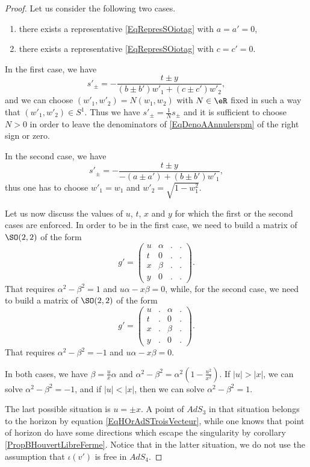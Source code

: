 \begin{proof}
Let us consider the following two cases.
\begin{enumerate}
\item
there exists a representative \eqref{EqRepresSOiotag} with $a=a'=0$,
\item
there exists a representative \eqref{EqRepresSOiotag} with $c=c'=0$.
\end{enumerate}
In the first case, we have 
\begin{equation}		\label{EqDenoAAnnulerspm}
	s'_{\pm}=-\frac{ t\pm y }{ (b\pm b')w'_1+(c\pm c')w'_2 },
\end{equation}
and we can choose $(w'_1,w'_2)=N(w_1,w_2)$ with $N\in\eR$ fixed in such a way that $(w'_1,w'_2)\in S^1$. Thus we have $s'_{\pm}=\frac{1}{ N }s_{\pm}$ and it is sufficient to choose $N>0$ in order to leave the denominators of \eqref{EqDenoAAnnulerspm} of the right sign or zero.

In the second case, we have
\begin{equation}
	s'_{\pm}=-\frac{ t\pm y }{ -(a\pm a')+(b\pm b')w'_1 },
\end{equation}
thus one has to choose $w'_1=w_1$ and $w'_2=\sqrt{1-w_1^2}$.

Let us now discuss the values of $u$, $t$, $x$ and $y$ for which the first or the second cases are enforced. In order to be in the first case, we need to build a matrix of $\SO(2,2)$ of the form
\begin{equation}
	g'=\begin{pmatrix}
 u	&	\alpha	&	.	&	.	\\ 
 t	&	0	&	.	&	.	\\ 
 x	&	\beta	&	.	&	.	\\ 
 y	&	0	&	.	&	.	 
 \end{pmatrix}.
\end{equation}
That requires $\alpha^2-\beta^2=1$ and $u\alpha-x\beta=0$, while, for the second case, we need to build a matrix of $\SO(2,2)$ of the form
\begin{equation}
	g'=\begin{pmatrix}
 u	&	.	&	\alpha	&	.	\\ 
 t	&	.	&	0	&	.	\\ 
 x	&	.	&	\beta	&	.	\\ 
 y	&	.	&	0	&	.		 
 \end{pmatrix}.
\end{equation}
That requires $\alpha^2-\beta^2=-1$ and $u\alpha-x\beta=0$. 

In both cases, we have $\beta=\frac{ u }{ x }\alpha$ and $\alpha^2-\beta^2=\alpha^2\left( 1-\frac{ u^2 }{ x^2 } \right)$. If $| u |>| x |$, we can solve $\alpha^2-\beta^2=-1$, and if $| u |<| x |$, then we can solve $\alpha^2-\beta^2=1$. 

The last possible situation is $u=\pm x$. A point of $AdS_3$ in that situation belongs to the horizon by equation \eqref{EqHOrAdSTroisVecteur}, while one knows that point of horizon do have some directions which escape the singularity by corollary \ref{PropBHouvertLibreFerme}. Notice that in the latter situation, we do not use the assumption that $\iota(v')$ is free in $AdS_4$.
\end{proof}

